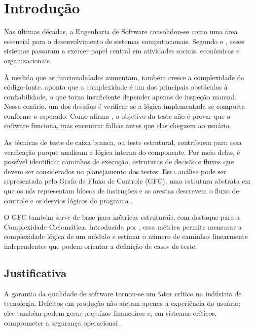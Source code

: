 \chapter{Introdução}
\label{cap:01}

Nas últimas décadas, a Engenharia de Software consolidou-se como uma área essencial para o desenvolvimento de sistemas computacionais. Segundo \cite{Pressman2016} e \cite{Sommerville2019}, esses sistemas passaram a exercer papel central em atividades sociais, econômicas e organizacionais.

À medida que as funcionalidades aumentam, também cresce a complexidade do código-fonte. \cite{Sommerville2019} aponta que a complexidade é um dos principais obstáculos à confiabilidade, o que torna insuficiente depender apenas de inspeção manual. Nesse cenário, um dos desafios é verificar se a lógica implementada se comporta conforme o esperado. Como afirma \cite{Myers2014}, o objetivo do teste não é provar que o software funciona, mas encontrar falhas antes que elas cheguem ao usuário.

As técnicas de teste de caixa branca, ou teste estrutural, contribuem para essa verificação porque analisam a lógica interna do componente. Por meio delas, é possível identificar caminhos de execução, estruturas de decisão e fluxos que devem ser considerados no planejamento dos testes. Essa análise pode ser representada pelo Grafo de Fluxo de Controle (GFC), uma estrutura abstrata em que os nós representam blocos de instruções e as arestas descrevem o fluxo de controle e os desvios lógicos do programa \cite{Delamaro2013}.

O GFC também serve de base para métricas estruturais, com destaque para a Complexidade Ciclomática. Introduzida por \cite{McCabe1976}, essa métrica permite mensurar a complexidade lógica de um módulo e estimar o número de caminhos linearmente independentes que podem orientar a definição de casos de teste.

\section{Justificativa}

A garantia da qualidade de software tornou-se um fator crítico na indústria de tecnologia. Defeitos em produção não afetam apenas a experiência do usuário; eles também podem gerar prejuízos financeiros e, em sistemas críticos, comprometer a segurança operacional \cite{Boehm2001}.

\pagebreak

